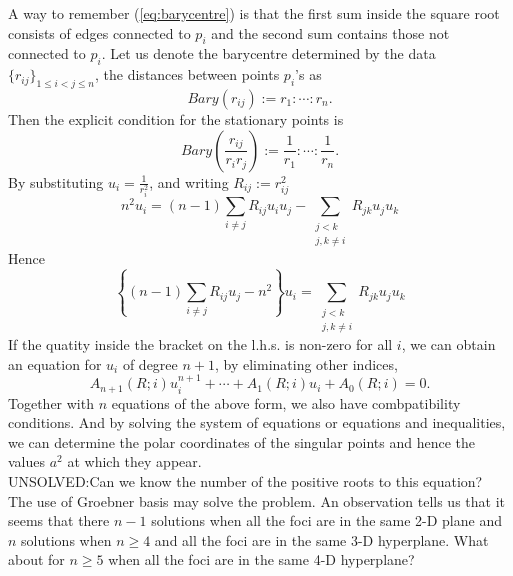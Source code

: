 \documentclass{article}
\begin{document}
A way to remember (\ref{eq:barycentre}) is that the first sum inside the square root consists of edges connected to \(p_i\) and the second sum contains those not connected to \(p_i\). Let us denote the barycentre determined by the data \(\{r_{ij}\}_{1\le i < j\le n}\), the distances between points \(p_i\)'s as
\begin{equation}
\label{ }
Bary(r_{ij}) := r_1 : \cdots : r_n  .
\end{equation}
Then the explicit condition for the stationary points is
\begin{equation}
\label{ }
Bary\left(\frac{r_{ij}}{r_i r_j}\right) := \frac{1}{r_1} : \cdots : \frac{1}{r_n}  .
\end{equation}
By substituting \(u_i = \frac{1}{r_i^2}\), and writing \(R_{ij} := r^2_{ij}\)
\begin{equation}
\label{}
n^2 u_i =   (n-1)\sum_{i\ne j } R_{ij}u_i u_j - \sum_{\substack{j < k \\ j,k \ne i}}R_{jk}u_j u_k
\end{equation}
Hence
\begin{equation}
\label{}
\left\{ (n-1)\sum_{i\ne j } R_{ij} u_j - n^2 \right\} u_i =     \sum_{\substack{j < k \\ j,k \ne i}}R_{jk}u_j u_k
\end{equation}
If the quatity inside the bracket on the l.h.s. is non-zero for all \(i\), we can obtain an equation for \(u_i\) of degree \(n+1\), by eliminating other indices,
\begin{equation}
\label{}
A_{n+1}(R;i)u_i^{n+1} + \cdots +A_{1}(R;i)u_i + A_0(R;i) = 0.
\end{equation}
Together with \(n\) equations of the above form, we also have combpatibility conditions. And by solving the system of equations or equations and inequalities, we can determine the polar coordinates of the singular points and hence the values \(a^2\) at which they appear.\\
UNSOLVED:Can we know the number of the positive roots to this equation?\\
The use of Groebner basis may solve the problem.
 An observation tells us that it seems that there \(n-1\) solutions when all the foci are in the same 2-D plane and \(n\) solutions when \(n\ge 4\) and all the foci are in the same 3-D hyperplane. What about for \(n \ge 5\) when all the foci are in the same 4-D hyperplane?
\end{document}
